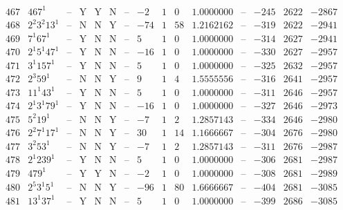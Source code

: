 \documentclass[11pt,reqno,a4letter]{article}
\numberwithin{figure}{section}
\numberwithin{table}{section}
\theoremstyle{plain}
\numberwithin{theorem}{section}
\theoremstyle{definition}
\begin{document}
\begin{table}[h!]
\begin{equation*}
{\begin{array}{|cc|c|ccc|c|c|ccc|c|ccc}
 467 & 467^1 & \text{--} & \text{Y} & \text{Y} & \text{N} & \text{--} & -2 & 1 & 0 & 1.0000000 & \text{--} & -245 & 2622 & -2867 \\
 468 & 2^2 3^2 13^1 & \text{--} & \text{N} & \text{N} & \text{Y} & \text{--} & -74 & 1 & 58 & 1.2162162 & \text{--} & -319 & 2622 & -2941 \\
 469 & 7^1 67^1 & \text{--} & \text{Y} & \text{N} & \text{N} & \text{--} & 5 & 1 & 0 & 1.0000000 & \text{--} & -314 & 2627 & -2941 \\
 470 & 2^1 5^1 47^1 & \text{--} & \text{Y} & \text{N} & \text{N} & \text{--} & -16 & 1 & 0 & 1.0000000 & \text{--} & -330 & 2627 & -2957 \\
 471 & 3^1 157^1 & \text{--} & \text{Y} & \text{N} & \text{N} & \text{--} & 5 & 1 & 0 & 1.0000000 & \text{--} & -325 & 2632 & -2957 \\
 472 & 2^3 59^1 & \text{--} & \text{N} & \text{N} & \text{Y} & \text{--} & 9 & 1 & 4 & 1.5555556 & \text{--} & -316 & 2641 & -2957 \\
 473 & 11^1 43^1 & \text{--} & \text{Y} & \text{N} & \text{N} & \text{--} & 5 & 1 & 0 & 1.0000000 & \text{--} & -311 & 2646 & -2957 \\
 474 & 2^1 3^1 79^1 & \text{--} & \text{Y} & \text{N} & \text{N} & \text{--} & -16 & 1 & 0 & 1.0000000 & \text{--} & -327 & 2646 & -2973 \\
 475 & 5^2 19^1 & \text{--} & \text{N} & \text{N} & \text{Y} & \text{--} & -7 & 1 & 2 & 1.2857143 & \text{--} & -334 & 2646 & -2980 \\
 476 & 2^2 7^1 17^1 & \text{--} & \text{N} & \text{N} & \text{Y} & \text{--} & 30 & 1 & 14 & 1.1666667 & \text{--} & -304 & 2676 & -2980 \\
 477 & 3^2 53^1 & \text{--} & \text{N} & \text{N} & \text{Y} & \text{--} & -7 & 1 & 2 & 1.2857143 & \text{--} & -311 & 2676 & -2987 \\
 478 & 2^1 239^1 & \text{--} & \text{Y} & \text{N} & \text{N} & \text{--} & 5 & 1 & 0 & 1.0000000 & \text{--} & -306 & 2681 & -2987 \\
 479 & 479^1 & \text{--} & \text{Y} & \text{Y} & \text{N} & \text{--} & -2 & 1 & 0 & 1.0000000 & \text{--} & -308 & 2681 & -2989 \\
 480 & 2^5 3^1 5^1 & \text{--} & \text{N} & \text{N} & \text{Y} & \text{--} & -96 & 1 & 80 & 1.6666667 & \text{--} & -404 & 2681 & -3085 \\
 481 & 13^1 37^1 & \text{--} & \text{Y} & \text{N} & \text{N} & \text{--} & 5 & 1 & 0 & 1.0000000 & \text{--} & -399 & 2686 & -3085 \\

\end{array}}
\end{equation*}
\end{table}
\end{document}
